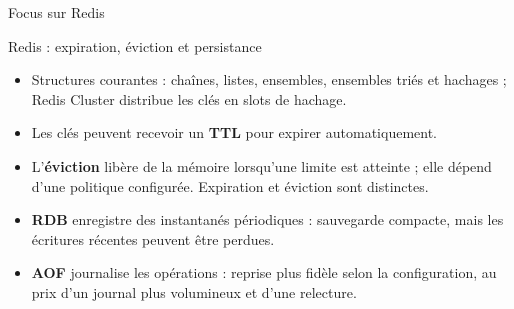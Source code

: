 \begin{frame}[standout]

    Focus sur Redis


\end{frame}

\begin{frame}{Redis : expiration, éviction et persistance}
    \begin{itemize}
        \item Structures courantes : chaînes, listes, ensembles, ensembles triés
              et hachages ; Redis Cluster distribue les clés en slots de
              hachage.
        \item Les clés peuvent recevoir un \textbf{TTL} pour expirer
              automatiquement.
        \item L'\textbf{éviction} libère de la mémoire lorsqu'une limite est
              atteinte ; elle dépend d'une politique configurée. Expiration et
              éviction sont distinctes.
        \item \textbf{RDB} enregistre des instantanés périodiques : sauvegarde
              compacte, mais les écritures récentes peuvent être perdues.
        \item \textbf{AOF} journalise les opérations : reprise plus fidèle selon
              la configuration, au prix d'un journal plus volumineux et d'une
              relecture.
    \end{itemize}

\end{frame}

